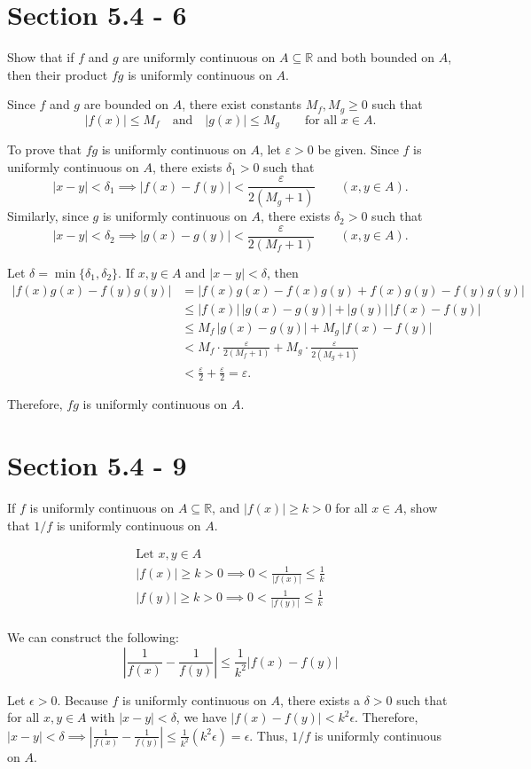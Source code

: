\section{Section 5.4 - 6}
Show that if $f$ and $g$ are uniformly continuous on $A \subseteq \mathbb{R}$ and both bounded on $A$, then their product $fg$ is uniformly continuous on $A$.

Since $f$ and $g$ are bounded on $A$, there exist constants $M_f, M_g \ge 0$ such that
\[
|f(x)| \le M_f \quad \text{and} \quad |g(x)| \le M_g \qquad \text{for all } x \in A.
\]

To prove that $fg$ is uniformly continuous on $A$, let $\varepsilon > 0$ be given. Since $f$ is uniformly continuous on $A$, there exists $\delta_1 > 0$ such that
\[
|x-y|<\delta_1 \implies |f(x)-f(y)| < \frac{\varepsilon}{2(M_g+1)}
\qquad (x,y\in A).
\]
Similarly, since $g$ is uniformly continuous on $A$, there exists $\delta_2 > 0$ such that
\[
|x-y|<\delta_2 \implies |g(x)-g(y)| < \frac{\varepsilon}{2(M_f+1)}
\qquad (x,y\in A).
\]

Let $\delta = \min\{\delta_1,\delta_2\}$. If $x,y\in A$ and $|x-y|<\delta$, then
\[
\begin{aligned}
|f(x)g(x)-f(y)g(y)|
&= |f(x)g(x)-f(x)g(y)+f(x)g(y)-f(y)g(y)| \\
&\le |f(x)|\,|g(x)-g(y)| + |g(y)|\,|f(x)-f(y)| \\
&\le M_f\,|g(x)-g(y)| + M_g\,|f(x)-f(y)| \\
&< M_f\cdot \frac{\varepsilon}{2(M_f+1)} + M_g\cdot \frac{\varepsilon}{2(M_g+1)} \\
&< \frac{\varepsilon}{2} + \frac{\varepsilon}{2} = \varepsilon.
\end{aligned}
\]

Therefore, $fg$ is uniformly continuous on $A$.

\section{Section 5.4 - 9}
If $f$ is uniformly continuous on $A \subseteq \mathbb{R}$, and $|f(x)| \geq k > 0$ for all $x \in A$, show that $1/f$ is uniformly continuous on $A$.

\[
\begin{gathered}
\text{Let } x,y \in A \\
|f(x)| \geq k > 0 \implies 0 < \frac{1}{|f(x)|} \leq \frac{1}{k} \\
|f(y)| \geq k > 0 \implies 0 < \frac{1}{|f(y)|} \leq \frac{1}{k} \\
\end{gathered}
\] 

We can construct the following:
\[
\left| \frac{1}{f(x)} - \frac{1}{f(y)} \right| \leq \frac{1}{k^2} \left| f(x)-f(y) \right|
\] 

Let $\epsilon > 0$. Because $f$ is uniformly continuous on $A$, there exists a $\delta > 0$ such that for all $x, y \in A$ with $|x-y| < \delta$, we have $|f(x) - f(y)| < k^2 \epsilon$.
Therefore, $|x-y| < \delta \implies \left| \frac{1}{f(x)} - \frac{1}{f(y)} \right| \leq \frac{1}{k^2} (k^2 \epsilon) = \epsilon$. Thus, $1/f$ is uniformly continuous on $A$.


